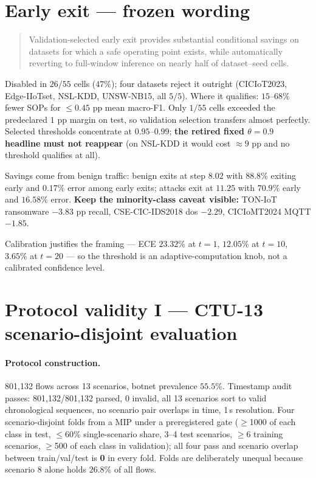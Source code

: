 \section*{Early exit --- frozen wording}

\begin{quote}
Validation-selected early exit provides substantial conditional savings on datasets
for which a safe operating point exists, while automatically reverting to full-window
inference on nearly half of dataset--seed cells.
\end{quote}

\noindent Disabled in $26/55$ cells ($47\%$); four datasets reject it outright
(CICIoT2023, Edge-IIoTset, NSL-KDD, UNSW-NB15, all $5/5$). Where it qualifies:
$15$--$68\%$ fewer SOPs for $\leq0.45$ pp mean macro-F1. Only $1/55$ cells exceeded
the predeclared $1$ pp margin on test, so validation selection transfers almost
perfectly. Selected thresholds concentrate at $0.95$--$0.99$; \textbf{the retired
fixed $\theta=0.9$ headline must not reappear} (on NSL-KDD it would cost $\approx9$ pp
and no threshold qualifies at all).

Savings come from benign traffic: benign exits at step $8.02$ with $88.8\%$ exiting
early and $0.17\%$ error among early exits; attacks exit at $11.25$ with $70.9\%$
early and $16.58\%$ error. \textbf{Keep the minority-class caveat visible:} TON-IoT
ransomware $-3.83$ pp recall, CSE-CIC-IDS2018 dos $-2.29$, CICIoMT2024 MQTT $-1.85$.

Calibration justifies the framing --- ECE $23.32\%$ at $t{=}1$, $12.05\%$ at
$t{=}10$, $3.65\%$ at $t{=}20$ --- so the threshold is an adaptive-computation knob,
not a calibrated confidence level.

\section*{Protocol validity I --- CTU-13 scenario-disjoint evaluation}

\paragraph{Protocol construction.} 801{,}132 flows across 13 scenarios, botnet
prevalence $55.5\%$. Timestamp audit passes: 801{,}132/801{,}132 parsed, 0 invalid, all
13 scenarios sort to valid chronological sequences, no scenario pair overlaps in time,
1\,\textmu s resolution. Four scenario-disjoint folds from a MIP under a preregistered
gate ($\geq$1000 of each class in test, $\leq60\%$ single-scenario share, 3--4 test
scenarios, $\geq$6 training scenarios, $\geq$500 of each class in validation); all four
pass and scenario overlap between train/val/test is \textbf{0} in every fold. Folds are
deliberately unequal because scenario 8 alone holds $26.8\%$ of all flows.

